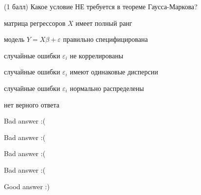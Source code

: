 
\begin{question}
(1 балл) Какое условие НЕ требуется в теореме Гаусса-Маркова?
\begin{answerlist}[2]
  \item матрица регрессоров \(X\) имеет полный ранг
  \item модель \(Y=X\beta + \varepsilon\) правильно специфицирована
  \item случайные ошибки \(\varepsilon_i\) не коррелированы
  \item случайные ошибки \(\varepsilon_i\) имеют одинаковые дисперсии
  \item случайные ошибки \(\varepsilon_i\) нормально распределены
  \item нет верного ответа
\end{answerlist}
\end{question}

\begin{solution}
\begin{answerlist}
  \item Bad answer :(
  \item Bad answer :(
  \item Bad answer :(
  \item Bad answer :(
  \item Good answer :)
\end{answerlist}
\end{solution}
